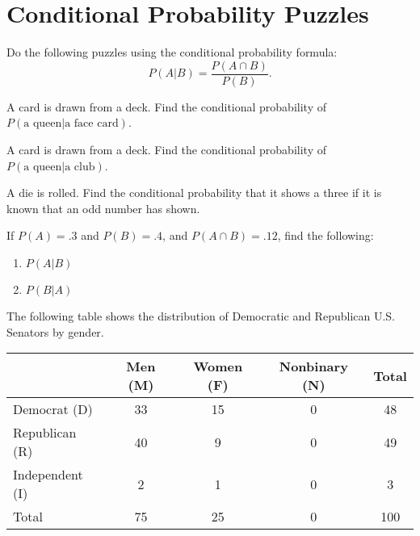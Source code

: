 \section{Conditional Probability Puzzles}

Do the following puzzles using the conditional probability formula: \[ P(A | B) = \frac{P(A \cap B)}{P(B)}. \]

\begin{puzzle}
    A card is drawn from a deck. Find the conditional probability of $P(\text{a queen} | \text{a face card})$.
\end{puzzle}

\begin{puzzle}
    A card is drawn from a deck. Find the conditional probability of $P(\text{a queen} | \text{a club})$.
\end{puzzle}

\begin{puzzle}
    A die is rolled. Find the conditional probability that it shows a three if it is known that an odd number has shown.
\end{puzzle}

\begin{puzzle}
    If $P(A) = .3$ and $P(B) = .4$, and $P(A \cap B) = .12$, find the following:
    \begin{enumerate}
        \item $P(A | B)$
        \item $P(B | A)$
    \end{enumerate}
\end{puzzle}



The following table shows the distribution of Democratic and Republican U.S. Senators by gender.
\begin{center}
    \begin{tabular}{|l|c|c|c|c|}
        \hline
                        & Men (M) & Women (F) & Nonbinary (N) & Total \\ \hline
        Democrat (D)    & 33      & 15        & 0             & 48    \\
        Republican (R)  & 40      & 9         & 0             & 49    \\
        Independent (I) & 2       & 1         & 0             & 3     \\
        Total           & 75      & 25        & 0             & 100   \\ \hline
    \end{tabular}
\end{center}

